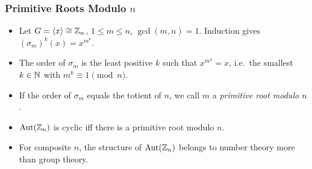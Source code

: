 \documentclass[../Odyssey_Project.tex]{subfiles}
\begin{document}
\subsubsection*{Primitive Roots Modulo $n$}
\begin{itemize}
    \item Let $G = \langle x \rangle \cong \mathbb{Z}_n$, $1 \leq m \leq n$, $\gcd(m,n) = 1$. Induction gives $(\sigma_m)^k(x) = x^{m^k}$.
    \item The order of $\sigma_m$ is the least positive $k$ such that $x^{m^k} = x$, i.e.\ the smallest $k \in \mathbb{N}$ with $m^k \equiv 1 \pmod{n}$.
    \item If the order of $\sigma_m$ equals the totient of $n$, we call $m$ a \emph{primitive root modulo $n$}.
    \item $\operatorname{Aut}(\mathbb{Z}_n)$ is cyclic iff there is a primitive root modulo $n$.
    \item For composite $n$, the structure of $\operatorname{Aut}(\mathbb{Z}_n)$ belongs to number theory more than group theory.
\end{itemize}
\end{document}
